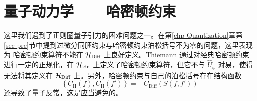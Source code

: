 
	\section{量子动力学——哈密顿约束}

		这里我们遇到了正则圈量子引力的困难问题之一。在第\ref{chp-Quantization}章第\ref{sec-pre}节中提到过微分同胚约束与哈密顿约束泊松括号不为零的问题，这里表现为 哈密顿约束算符不能在 $\mathcal{H}_{\text{Diff}}$ 上良好定义。Thiemann 通过对经典哈密顿约束进行一定的正规化，在 $\mathcal{H}_{\text{kin}}$ 上定义了哈密顿约束算符\cite{Thiemann1996aw}，但它不与 $\hat{U}_{\varphi}$ 对易，使得无法将其定义在 $\mathcal{H}_{\text{Diff}}$ 上。另外，哈密顿约束与自己的泊松括号存在结构函数
		\begin{equation}
			\left\{ C_{\text{H}}(f), C_{\text{H}}(f') \right\} = - C_{\text{Diff}}(S(f,f'))
		\end{equation}
		还导致了量子反常，这是应当避免的。

